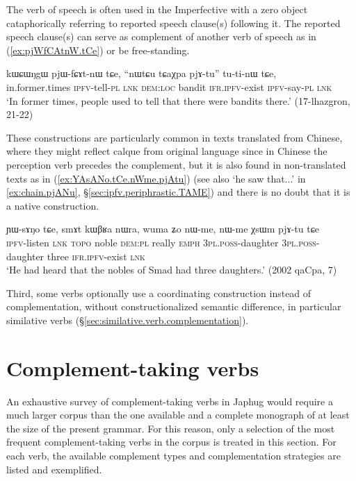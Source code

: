 The verb of speech  is often used in the Imperfective with a zero object cataphorically referring to reported speech clause(s) following it. The reported speech clause(s) can serve as complement of another verb of speech as in (\ref{ex:pjWfCAtnW.tCe}) or be free-standing.

\begin{exe}
	\ex \label{ex:pjWfCAtnW.tCe}
	\gll kɯɕɯŋgɯ pjɯ-fɕɤt-nɯ tɕe, ``nɯtɕu tɕaχpa pjɤ-tu'' tu-ti-nɯ tɕe,  \\
	in.former.times \textsc{ipfv}-tell-\textsc{pl} \textsc{lnk} \textsc{dem}:\textsc{loc} bandit \textsc{ifr}.\textsc{ipfv}-exist \textsc{ipfv}-say-\textsc{pl} \textsc{lnk} \\
	\glt `In former times, people used to tell that there were bandits there.' (17-lhazgron, 21-22)
\end{exe}

These constructions are particularly common in texts translated from Chinese, where they might reflect calque from original language since in Chinese the perception verb precedes the complement, but it is also found in non-translated texts as in (\ref{ex:YAsANo.tCe.nWme.pjAtu}) (see also  `he saw that...' in  \ref{ex:chain.pjANu}, §\ref{sec:ipfv.periphrastic.TAME}) and there is no doubt that it is a native construction.

\begin{exe}
	\ex \label{ex:YAsANo.tCe.nWme.pjAtu}
	\gll ɲɯ-sɤŋo tɕe, smɤt kɯβʁa nɯra, wuma ʑo nɯ-me, nɯ-me χsɯm pjɤ-tu tɕe \\
	\textsc{ipfv}-listen \textsc{lnk}  \textsc{topo} noble \textsc{dem}:\textsc{pl} really \textsc{emph} \textsc{3pl}.\textsc{poss}-daughter  \textsc{3pl}.\textsc{poss}-daughter  three \textsc{ifr}.\textsc{ipfv}-exist \textsc{lnk} \\
	\glt `He had heard that the nobles of Smad had three daughters.' (2002 qaCpa, 7) 
\end{exe}

Third, some verbs optionally use a coordinating construction instead of complementation, without constructionalized semantic difference, in particular similative verbs (§\ref{sec:similative.verb.complementation}).


\section{Complement-taking verbs} \label{sec:complement.taking.verbs}

An exhaustive survey of complement-taking verbs in Japhug would require a much larger corpus than the one available and a complete monograph of at least the size of the present grammar. For this reason, only a selection of the most frequent complement-taking verbs in the corpus is treated in this section. For each verb, the available complement types and complementation strategies are listed and exemplified.

